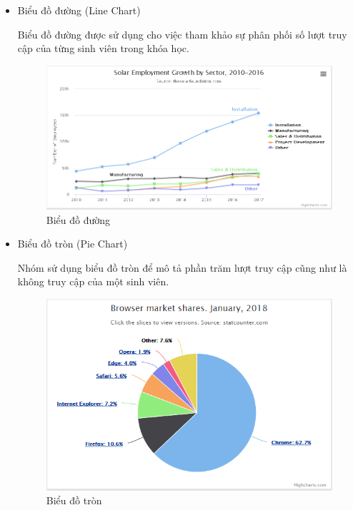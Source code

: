 \begin{itemize}
	\item Biểu đồ đường (Line Chart)
	
	Biểu đồ đường được sử dụng cho việc tham khảo sự phân phối số lượt truy cập của từng sinh viên trong khóa học.
	
	\begin{center}
		\begin{figure}[htp]
			\begin{center}
				\includegraphics[scale=0.7]{img/line}
			\end{center}
			\caption{Biểu đồ đường}
			\label{refhinh18}
		\end{figure}
	\end{center}

	\vskip 6cm
	\item Biểu đồ tròn (Pie Chart)
	
	Nhóm sử dụng biểu đồ tròn để mô tả phần trăm lượt truy cập cũng như là không truy cập của một sinh viên.
	
	\begin{center}
		\begin{figure}[htp]
			\begin{center}
				\includegraphics[scale=0.7]{img/piechart}
			\end{center}
			\caption{Biểu đồ tròn}
			\label{refhinh79}
		\end{figure}
	\end{center}


\end{itemize}
